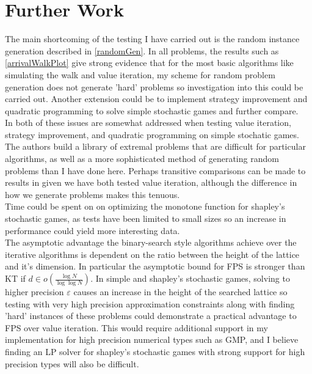\section{Further Work}
The main shortcoming of the testing I have carried out is the random instance generation described in \cref{randomGen}.
In all problems, the results such as \cref{arrivalWalkPlot} give strong evidence
that for the most basic algorithms like simulating the walk and value iteration,
my scheme for random problem generation does not generate 'hard' problems so investigation
into this could be carried out. Another extension
could be to implement strategy improvement and quadratic programming
to solve simple stochastic games and further compare.\\
In \citep{valueIterationTest} both of these issues are somewhat addressed when testing value iteration,
strategy improvement, and quadratic programming on simple stochatic games. The authors
build a library of extremal problems that are difficult for particular algorithms, as well as a more
sophisticated method of generating random problems than I have done here. Perhaps transitive
comparisons can be made to results in \citep{valueIterationTest} given
we have both tested value iteration, although the difference in how we generate problems makes this tenuous. \\
Time could be spent on on optimizing the monotone function for shapley's stochastic games,
as tests have been limited to small sizes so an increase in performance could yield more interesting data. \\
The asymptotic advantage the binary-search style algorithms achieve over the iterative algorithms
is dependent on the ratio between the height of the lattice and it's dimension. In particular
the asymptotic bound for FPS is stronger than KT if $d \in o(\frac{\log N}{\log \log N})$.
In simple and shapley's stochastic games, solving to higher precision $\varepsilon$ causes
an increase in the height of the searched lattice so testing with very high precision
approximation constraints along with finding 'hard' instances of these problems could
demonstrate a practical advantage to FPS over value iteration. This would require additional support
in my implementation for high precision numerical types such as GMP\citep{gmp}, and
I believe finding an LP solver for shapley's stochastic games 
with strong support for high precision types will also be difficult.

